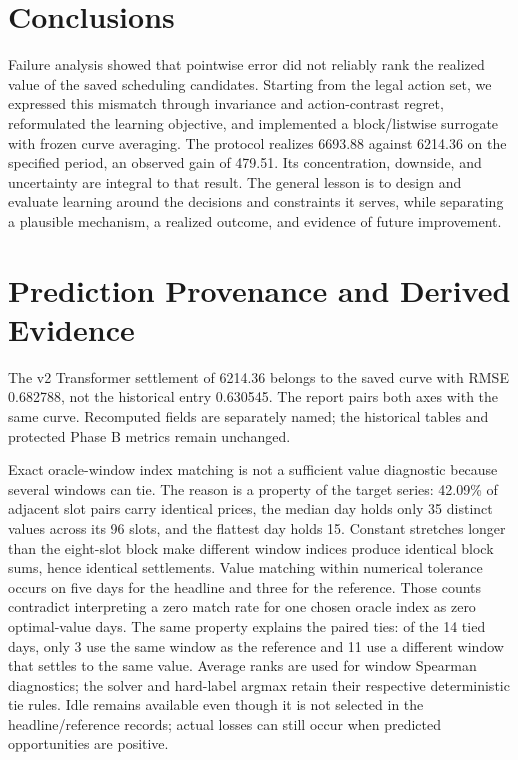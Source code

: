 \documentclass[11pt,a4paper]{article}
\begin{document}
\section{Conclusions}
Failure analysis showed that pointwise error did not reliably rank the realized value of the saved scheduling candidates. Starting from the legal action set, we expressed this mismatch through invariance and action-contrast regret, reformulated the learning objective, and implemented a block/listwise surrogate with frozen curve averaging. The protocol realizes 6693.88 against 6214.36 on the specified period, an observed gain of 479.51. Its concentration, downside, and uncertainty are integral to that result. The general lesson is to design and evaluate learning around the decisions and constraints it serves, while separating a plausible mechanism, a realized outcome, and evidence of future improvement.
\FloatBarrier



\appendix
\renewcommand{\arraystretch}{1.04}
\setlength{\textfloatsep}{9pt}
\setlength{\intextsep}{9pt}
\section{Prediction Provenance and Derived Evidence}\label{app:provenance}

The v2 Transformer settlement of 6214.36 belongs to the saved curve with RMSE 0.682788, not the historical entry 0.630545. The report pairs both axes with the same curve. Recomputed fields are separately named; the historical tables and protected Phase B metrics remain unchanged.

Exact oracle-window index matching is not a sufficient value diagnostic because several windows can tie. The reason is a property of the target series: 42.09\% of adjacent slot pairs carry identical prices, the median day holds only 35 distinct values across its 96 slots, and the flattest day holds 15. Constant stretches longer than the eight-slot block make different window indices produce identical block sums, hence identical settlements. Value matching within numerical tolerance occurs on five days for the headline and three for the reference. Those counts contradict interpreting a zero match rate for one chosen oracle index as zero optimal-value days. The same property explains the paired ties: of the 14 tied days, only 3 use the same window as the reference and 11 use a different window that settles to the same value. Average ranks are used for window Spearman diagnostics; the solver and hard-label argmax retain their respective deterministic tie rules. Idle remains available even though it is not selected in the headline/reference records; actual losses can still occur when predicted opportunities are positive.


\FloatBarrier
\end{document}
